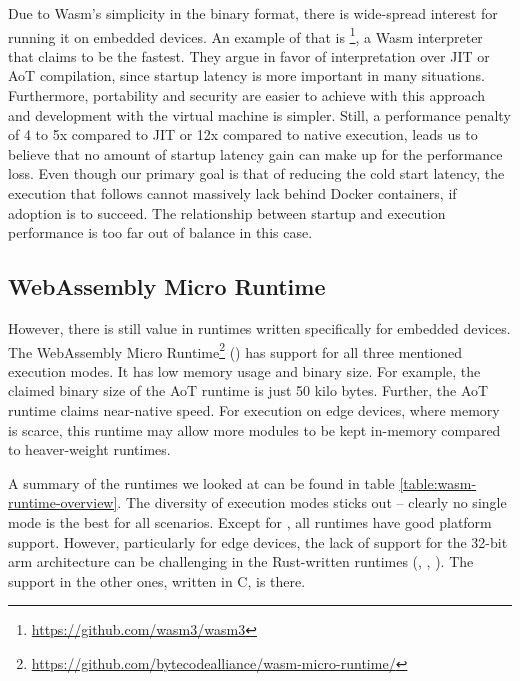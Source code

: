 Due to Wasm's simplicity in the binary format, there is wide-spread interest for running it on embedded devices. An example of that is \footnote{\url{https://github.com/wasm3/wasm3}}, a Wasm interpreter that claims to be the fastest. They argue in favor of interpretation over JIT or AoT compilation, since startup latency is more important in many situations. Furthermore, portability and security are easier to achieve with this approach and development with the virtual machine is simpler. Still, a performance penalty of 4 to 5x compared to JIT or 12x compared to native execution, leads us to believe that no amount of startup latency gain can make up for the performance loss. Even though our primary goal is that of reducing the cold start latency, the execution that follows cannot massively lack behind Docker containers, if adoption is to succeed. The relationship between startup and execution performance is too far out of balance in this case.

\subsection{WebAssembly Micro Runtime}

However, there is still value in runtimes written specifically for embedded devices. The WebAssembly Micro Runtime\footnote{\url{https://github.com/bytecodealliance/wasm-micro-runtime/}} () has support for all three mentioned execution modes. It has low memory usage and binary size. For example, the claimed binary size of the AoT runtime is just 50 kilo bytes. Further, the AoT runtime claims near-native speed. For execution on edge devices, where memory is scarce, this runtime may allow more modules to be kept in-memory compared to heaver-weight runtimes.

A summary of the runtimes we looked at can be found in table \ref{table:wasm-runtime-overview}. The diversity of execution modes sticks out -- clearly no single mode is the best for all scenarios. Except for , all runtimes have good platform support. However, particularly for edge devices, the lack of support for the 32-bit arm architecture can be challenging in the Rust-written runtimes (, , ). The support in the other ones, written in C, is there.

\newcommand{\linux}{}
\newcommand{\macos}{}
\newcommand{\windows}{}
\newcommand{\freebsd}{}
\newcommand{\android}{}
\newcommand{\ios}{}

